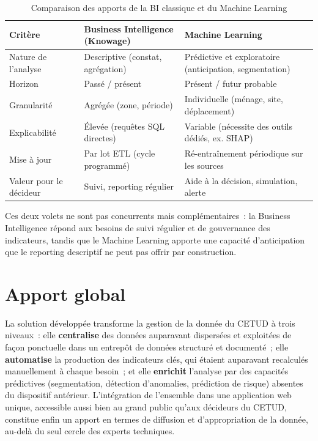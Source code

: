 \begin{table}[H]
\centering
\caption{Comparaison des apports de la BI classique et du Machine Learning}
\label{tab:bi_vs_ml}
\begin{tabular}{p{3.5cm}p{5.5cm}p{5.5cm}}
\toprule
\textbf{Critère} & \textbf{Business Intelligence (Knowage)} & \textbf{Machine Learning} \\
\midrule
Nature de l'analyse & Descriptive (constat, agrégation) & Prédictive et exploratoire (anticipation, segmentation) \\
Horizon & Passé / présent & Présent / futur probable \\
Granularité & Agrégée (zone, période) & Individuelle (ménage, site, déplacement) \\
Explicabilité & Élevée (requêtes SQL directes) & Variable (nécessite des outils dédiés, ex. SHAP) \\
Mise à jour & Par lot ETL (cycle programmé) & Ré-entraînement périodique sur les sources \\
Valeur pour le décideur & Suivi, reporting régulier & Aide à la décision, simulation, alerte \\
\bottomrule
\end{tabular}
\end{table}

Ces deux volets ne sont pas concurrents mais complémentaires~: la Business Intelligence répond aux besoins de suivi régulier et de gouvernance des indicateurs, tandis que le Machine Learning apporte une capacité d'anticipation que le reporting descriptif ne peut pas offrir par construction.

\section{Apport global}
La solution développée transforme la gestion de la donnée du CETUD à trois niveaux~: elle \textbf{centralise} des données auparavant dispersées et exploitées de façon ponctuelle dans un entrepôt de données structuré et documenté~; elle \textbf{automatise} la production des indicateurs clés, qui étaient auparavant recalculés manuellement à chaque besoin~; et elle \textbf{enrichit} l'analyse par des capacités prédictives (segmentation, détection d'anomalies, prédiction de risque) absentes du dispositif antérieur. L'intégration de l'ensemble dans une application web unique, accessible aussi bien au grand public qu'aux décideurs du CETUD, constitue enfin un apport en termes de diffusion et d'appropriation de la donnée, au-delà du seul cercle des experts techniques.

